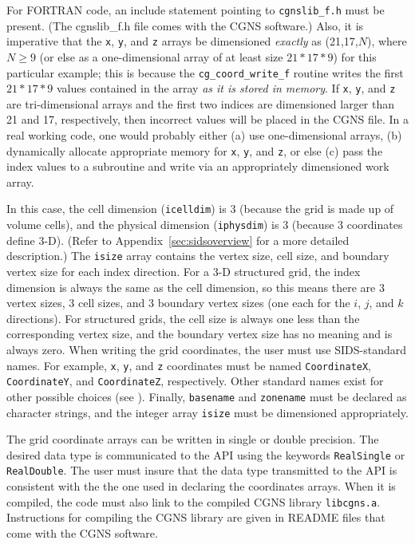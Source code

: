 \documentclass[12pt]{article}
\begin{document}
For FORTRAN code, an include statement
pointing to {\tt cgnslib\_f.h} must be present.  (The cgnslib\_f.h
file comes with the CGNS software.)  Also, it is
imperative that the {\tt x}, {\tt y}, and {\tt z} arrays be dimensioned
{\it exactly} as (21,17,$N$), where $N \geq 9$ (or
else as a one-dimensional array of at least size $21*17*9$) 
for this particular example; 
this is because the {\tt cg\_coord\_write\_f}
routine writes the first $21*17*9$ values contained in the
array {\it as it is stored
in memory}.  If {\tt x}, {\tt y}, and {\tt z} are tri-dimensional arrays
and the first two indices 
are dimensioned larger than 21 and 17, respectively, then incorrect
values will be placed in the CGNS file.  In a real
working code, one would probably either (a) use one-dimensional
arrays, (b) dynamically allocate
appropriate memory for {\tt x}, {\tt y}, and {\tt z}, or else (c) pass the index
values to a subroutine and write via an appropriately dimensioned
work array.

In this case, the cell dimension ({\tt icelldim}) is 3
(because the grid is made up of volume cells), and the
physical dimension ({\tt iphysdim}) is 3 (because 3 coordinates
define 3-D).  (Refer to Appendix~\ref{sec:sidsoverview} for a more
detailed description.)  The {\tt isize} array
contains the vertex size, cell size, and
boundary vertex size for each index direction.  For a 3-D
structured grid, the index dimension is always the same as
the cell dimension, so this
means there are 3 vertex sizes, 3 cell sizes, and 3 boundary vertex sizes
(one each for the $i$, $j$, and $k$ directions).  For structured grids, 
the cell size is always one less than the corresponding vertex
size, and the boundary vertex size has no meaning and is always zero.
When writing the grid coordinates, the user must use SIDS-standard
names.  For example, {\tt x}, {\tt y}, and {\tt z} coordinates must be named
{\tt CoordinateX}, {\tt CoordinateY}, and {\tt CoordinateZ},
respectively.  Other standard names exist for other possible choices
(see \cite{ALLMARAS}).
Finally, {\tt basename} and {\tt zonename} must be declared as character
strings, and the integer array {\tt isize} must be dimensioned
appropriately.

The grid coordinate arrays can be written in single or double
precision.  The desired data type is communicated to the API using the
keywords {\tt RealSingle} or {\tt RealDouble}.  The user must
insure that the data type transmitted to the API is consistent with
the the one used in declaring the coordinates arrays.
When it is compiled, the code must also link to the 
compiled CGNS library {\tt libcgns.a}.
Instructions for compiling the CGNS library
are given in README files that come with the CGNS software.
\end{document}
